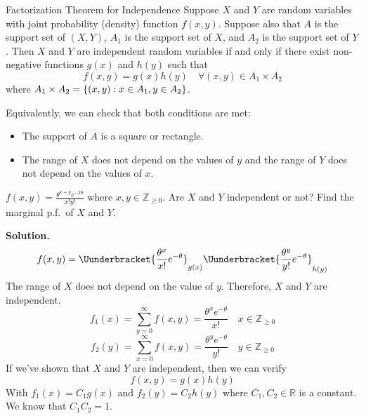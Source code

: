 \begin{Theorem}{Factorization Theorem for Independence}{}
    Suppose $ X $ and $ Y $ are random variables
    with joint probability (density) function $ f(x,y) $. Suppose
    also that $ A $ is the support set of $ (X,Y) $,
    $ A_1 $ is the support set of $ X $,
    and $ A_2 $ is the support set of $ Y $. Then
    $ X $ and $ Y $ are independent random variables
    if and only if there exist non-negative functions
    $ g(x) $ and $ h(y) $ such that
    \[ f(x,y)=g(x)h(y)\quad\forall(x,y)\in A_1\times A_2 \]
    where $ A_1\times A_2=\{(x,y):x\in A_1,y\in A_2\} $.
\end{Theorem}
\begin{Remark}{}{}
    Equivalently, we can check that both conditions are met:
    \begin{itemize}
        \item The support of $ A $ is a square or rectangle.
        \item The range of $ X $ does not depend on the values
              of $ y $ and the range of $ Y $ does not depend on the values of $ x $.
    \end{itemize}
\end{Remark}

\begin{Example}{}{}
    $ \displaystyle f(x,y)=\frac{\theta^{x+y}e^{-2\theta}}{x!y!} $
    where $ x,y\in\mathbb{Z}_{\ge 0} $. Are $ X $ and $ Y $
    independent or not? Find the marginal p.f.\ of $ X $ and $ Y $.

    \textbf{Solution.}
    \[ f(x,y)=\Uunderbracket{\frac{\theta^x}{x!} e^{-\theta}}_{g(x)}
        \Uunderbracket{\frac{\theta^y}{y!}e^{-\theta} }_{h(y)} \]
    The range of $ X $ does not depend on the value of $ y $. Therefore,
    $ X $ and $ Y $ are independent.
    \[ f_1(x)=\sum\limits_{y=0}^{\infty} f(x,y)=\frac{\theta^x e^{-\theta}}{x!}\quad x\in
        \mathbb{Z}_{\ge 0} \]
    \[ f_2(y)=\sum\limits_{x=0}^{\infty} f(x,y)=\frac{\theta^y e^{-\theta}}{y!}\quad y\in
        \mathbb{Z}_{\ge 0} \]
    If we've shown that $ X $ and $ Y $ are independent, then we can verify
    \[ f(x,y)=g(x)h(y) \]
    With $ f_1(x)=C_1 g(x) $ and $ f_2(y)=C_2 h(y) $
    where $ C_1,C_2\in\mathbb{R} $ is a constant. We know that $ C_1C_2=1 $.
\end{Example}

